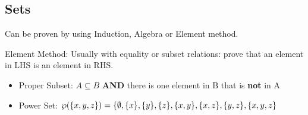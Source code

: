 \documentclass[landscape, letterpaper]{article}
\begin{document}
\begin{multicols}{2}
    \section*{Sets}
    Can be proven by using Induction, Algebra or Element method.

    Element Method: Usually with equality or subset relations: prove that an element in LHS is an element in RHS.
    \begin{itemize}
        \item Proper Subset: $A \subseteq B$ \textbf{AND} there is one element in B that is \textbf{not} in A
        \item Power Set: $\wp(\{x, y, z\}) = \{\emptyset, \{x\}, \{y\}, \{z\},\\
                  \{x, y\},\{x, z\}, \{y, z\}, \{x, y, z\}$
    \end{itemize}

\end{multicols}
\end{document}
